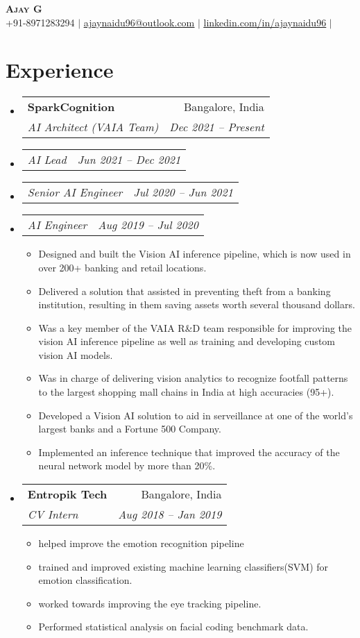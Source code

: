 \documentclass[letterpaper,11pt]{article}
\makeatletter
\newcommand{\resumeItem}[1]{
  \item\small{
    {#1 \vspace{-2pt}}
  }
}
\newcommand{\resumeSubheading}[4]{
  \vspace{-2pt}\item
    \begin{tabular*}{0.97\textwidth}[t]{l@{\extracolsep{\fill}}r}
      \textbf{#1} & #2 \\
      \textit{\small#3} & \textit{\small #4} \\
    \end{tabular*}\vspace{-7pt}
}
\newcommand{\resumeSubSubheading}[2]{
    \item
    \begin{tabular*}{0.97\textwidth}{l@{\extracolsep{\fill}}r}
      \textit{\small#1} & \textit{\small #2} \\
    \end{tabular*}\vspace{-7pt}
}
\newcommand{\resumeSubHeadingListStart}{\begin{itemize}[leftmargin=0.15in, label={}]}
\newcommand{\resumeSubHeadingListEnd}{\end{itemize}}
\newcommand{\resumeItemListStart}{\begin{itemize}}
\newcommand{\resumeItemListEnd}{\end{itemize}\vspace{-5pt}}
\makeatother
\begin{document}
\begin{center}
    \textbf{\Huge \scshape Ajay G} \\ \vspace{1pt}
    \small +91-8971283294 $|$ \href{mailto:ajaynaidu96@outlook.com}{\underline{ajaynaidu96@outlook.com}} $|$ 
    \href{https://www.linkedin.com/in/ajaynaidu96/}{\underline{linkedin.com/in/ajaynaidu96}} $|$
\end{center}


\section{Experience}
  \resumeSubHeadingListStart

    \resumeSubheading
      {SparkCognition}{Bangalore, India}
      {AI Architect (VAIA Team)}{Dec 2021 -- Present}
      \resumeSubSubheading
        {AI Lead}{Jun 2021 -- Dec 2021}
      \resumeSubSubheading
        {Senior AI Engineer}{Jul 2020 -- Jun 2021}
      \resumeSubSubheading
        {AI Engineer}{Aug 2019 -- Jul 2020}
          \resumeItemListStart
            \resumeItem{Designed and built the Vision AI inference pipeline, which is now used in over 200+ banking and retail locations.}
            \resumeItem{Delivered a solution that assisted in preventing theft from a banking institution, resulting in them saving assets worth several thousand dollars.}
            \resumeItem{Was a key member of the VAIA R\&D team responsible for improving the vision AI inference pipeline as well as training and developing custom vision AI models.}
            \resumeItem{Was in charge of delivering vision analytics to recognize footfall patterns to the largest shopping mall chains in India at high accuracies (95+).}
            \resumeItem{Developed a Vision AI solution to aid in serveillance at one of the world's largest banks and a Fortune 500 Company.}
            \resumeItem{Implemented an inference technique that improved the accuracy of the neural network model by more than 20\%.}
          \resumeItemListEnd

      \resumeSubheading
      {Entropik Tech}{Bangalore, India} 
      {CV Intern}{Aug 2018 -- Jan 2019}
      \resumeItemListStart
        \resumeItem{helped improve the emotion recognition pipeline}
        \resumeItem{trained and improved existing machine learning classifiers(SVM) for emotion classification.}
        \resumeItem{worked towards improving the eye tracking pipeline.}
        \resumeItem{Performed statistical analysis on facial coding benchmark data.}
      \resumeItemListEnd
  \resumeSubHeadingListEnd
\end{document}
